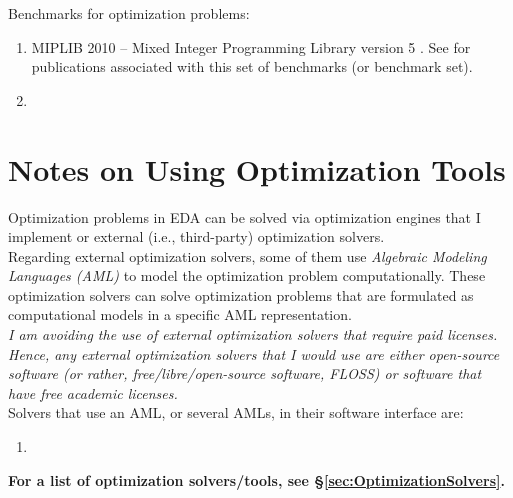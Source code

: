 Benchmarks for optimization problems: \vspace{-0.3cm}
\begin{enumerate} \itemsep -4pt
\item MIPLIB 2010 -- Mixed Integer Programming Library version 5 \cite{Koch2011a}. See \cite{Achterberg2015a} for publications associated with this set of benchmarks (or benchmark set).
\item 
\end{enumerate}





\section{Notes on Using Optimization Tools}
\label{sec:NotesonUsingOptimizationTools}


Optimization problems in EDA can be solved via optimization engines that I implement or external (i.e., third-party) optimization solvers. \\

Regarding external optimization solvers, some of them use {\it Algebraic Modeling Languages (AML)} \cite{WikipediaContributors2015i} to model the optimization problem computationally. These optimization solvers can solve optimization problems that are formulated as computational models in a specific AML representation. \\

{\it I am avoiding the use of external optimization solvers that require paid licenses. Hence, any external optimization solvers that I would use are either open-source software (or rather, free/libre/open-source software, FLOSS) or software that have free academic licenses.} \\

Solvers that use an AML, or several AMLs, in their software interface are: \vspace{-0.3cm}
\begin{enumerate} \itemsep -4pt
\item 
\end{enumerate}

{\bf For a list of optimization solvers/tools, see \S\ref{sec:OptimizationSolvers}.}














